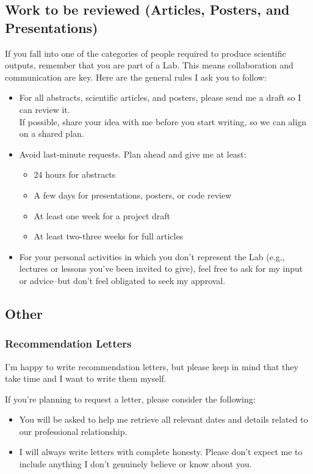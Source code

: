 \documentclass[12pt]{article}
\begin{document}
\subsection{Work to be reviewed (Articles, Posters, and Presentations)}
\label{subsec:Articles}
If you fall into one of the categories of people required to produce scientific outputs, remember that you are part of a Lab. This means collaboration and communication are key. Here are the general rules I ask you to follow:

\begin{itemize}
\item For all abstracts, scientific articles, and posters, please send me a draft so I can review it. \\
If possible, share your idea with me before you start writing, so we can align on a shared plan.
\item Avoid last-minute requests. Plan ahead and give me at least:
  \begin{itemize}
    \item 24 hours for abstracts
    \item A few days for presentations, posters, or code review
    \item At least one week for a project draft
    \item At least two-three weeks for full articles
  \end{itemize}
\item For your personal activities in which you don't represent the Lab (e.g., lectures or lessons you've been invited to give), feel free to ask for my input or advice--but don't feel obligated to seek my approval.
\end{itemize}

\subsection{Other}

\subsubsection{Recommendation Letters}

I'm happy to write recommendation letters, but please keep in mind that they take time and I want to write them myself.  

If you're planning to request a letter, please consider the following:

\begin{itemize}
\item You will be asked to help me retrieve all relevant dates and details related to our professional relationship.
\item I will always write letters with complete honesty. Please don't expect me to include anything I don't genuinely believe or know about you.
\end{itemize}
\end{document}

